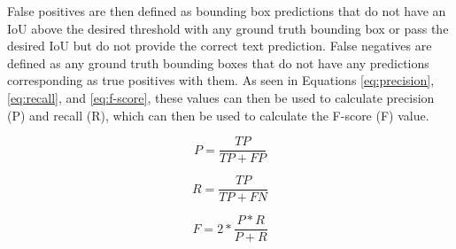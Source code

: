 \documentclass[a4paper,11pt]{article}
\begin{document}
\noindent
False positives are then defined as bounding box predictions that do not have an IoU above the desired threshold with any ground truth bounding box or pass the desired IoU but do not provide the correct text prediction. False negatives are defined as any ground truth bounding boxes that do not have any predictions corresponding as true positives with them. As seen in Equations \ref{eq:precision}, \ref{eq:recall}, and \ref{eq:f-score}, these values can then be used to calculate precision (P) and recall (R), which can then be used to calculate the F-score (F) value.

\begin{equation}
\label{eq:precision}
P=\frac{TP}{TP+FP}
\end{equation}

\begin{equation}
\label{eq:recall}
R=\frac{TP}{TP+FN}
\end{equation}

\begin{equation}
\label{eq:f-score}
F=2*\frac{P*R}{P+R}
\end{equation}
\end{document}
